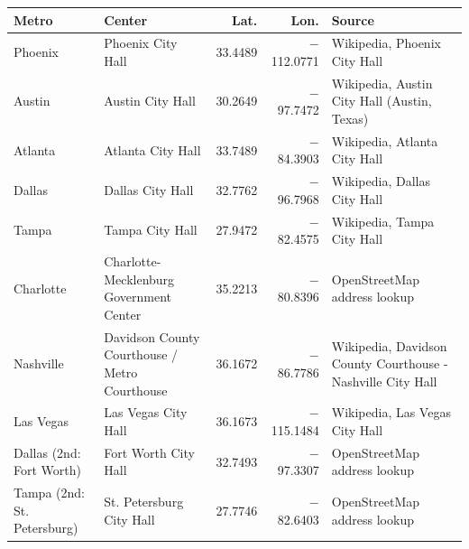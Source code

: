 \footnotesize\setlength{\tabcolsep}{4pt}
\begin{tabular}{p{2.7cm}p{3.9cm}rrp{4.0cm}}
\toprule
Metro & Center & Lat. & Lon. & Source \\
\midrule
Phoenix & Phoenix City Hall & 33.4489 & $-$112.0771 & Wikipedia, Phoenix City Hall \\
Austin & Austin City Hall & 30.2649 & $-$97.7472 & Wikipedia, Austin City Hall (Austin, Texas) \\
Atlanta & Atlanta City Hall & 33.7489 & $-$84.3903 & Wikipedia, Atlanta City Hall \\
Dallas & Dallas City Hall & 32.7762 & $-$96.7968 & Wikipedia, Dallas City Hall \\
Tampa & Tampa City Hall & 27.9472 & $-$82.4575 & Wikipedia, Tampa City Hall \\
Charlotte & Charlotte-Mecklenburg Government Center & 35.2213 & $-$80.8396 & OpenStreetMap address lookup \\
Nashville & Davidson County Courthouse / Metro Courthouse & 36.1672 & $-$86.7786 & Wikipedia, Davidson County Courthouse - Nashville City Hall \\
Las Vegas & Las Vegas City Hall & 36.1673 & $-$115.1484 & Wikipedia, Las Vegas City Hall \\
Dallas (2nd: Fort Worth) & Fort Worth City Hall & 32.7493 & $-$97.3307 & OpenStreetMap address lookup \\
Tampa (2nd: St. Petersburg) & St. Petersburg City Hall & 27.7746 & $-$82.6403 & OpenStreetMap address lookup \\
\bottomrule
\end{tabular}
